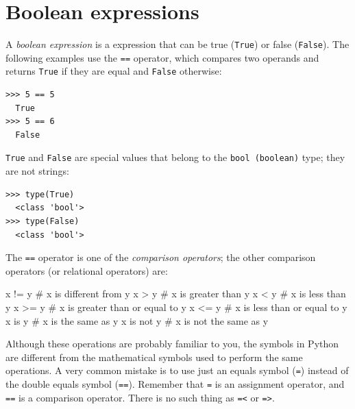 \hypertarget{expresiones-booleanas}{%
\section{Boolean expressions}\label{expresiones-booleanas}}

 
 

A \emph{boolean expression} is a expression that can be true (\texttt{True}) or false (\texttt{False}). The following examples use the \texttt{==} operator, which compares two operands and returns
\texttt{True} if they are equal and \texttt{False} otherwise:

\begin{Verbatim}[frame=single]
>>> 5 == 5
  True
>>> 5 == 6
  False
\end{Verbatim}

\texttt{True} and \texttt{False} are special values that belong to the \texttt{bool\ (boolean)} type; they are not strings:

 
 
 

\begin{Verbatim}[frame=single]
>>> type(True)
  <class 'bool'>
>>> type(False)
  <class 'bool'>
\end{Verbatim}

The \texttt{==} operator is one of the \emph{comparison operators}; the other comparison operators (or relational operators) are:

\begin{python}[frame=single]
x != y               # x is different from y
x > y                # x is greater than y
x < y                # x is less than y
x >= y               # x is greater than or equal to y
x <= y               # x is less than or equal to y
x is y               # x is the same as y
x is not y           # x is not the same as y
\end{python}

Although these operations are probably familiar to you, the symbols in Python are different from the mathematical symbols used to perform the same operations. A very common mistake is to use just an equals symbol (\texttt{=}) instead of the double equals symbol (\texttt{==}). Remember that \texttt{=} is an assignment operator, and \texttt{==} is a comparison operator. There is no such thing as \texttt{=\textless{}} or \texttt{=\textgreater{}}.

